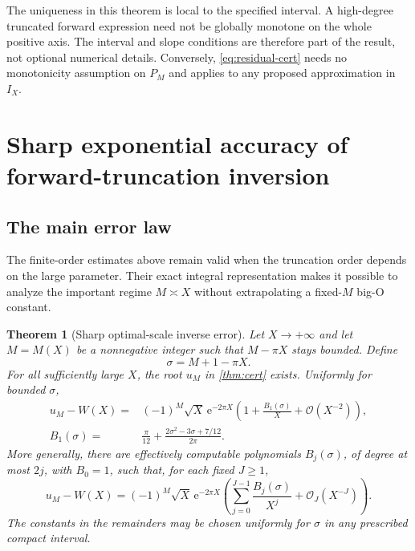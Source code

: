 \documentclass[11pt,a4paper]{article}
\newtheorem{theorem}{Theorem}[section]
\theoremstyle{definition}
\numberwithin{equation}{section}
\newcommand{\ee}{\mathrm{e}}
\newcommand{\Oh}{\mathcal O}
\begin{document}
The uniqueness in this theorem is local to the specified interval. A high-degree truncated forward expression need not be globally monotone on the whole positive axis. The interval and slope conditions are therefore part of the result, not optional numerical details. Conversely, \eqref{eq:residual-cert} needs no monotonicity assumption on $P_M$ and applies to any proposed approximation in $I_X$.

\section{Sharp exponential accuracy of forward-truncation inversion}
\label{sec:optimal}

\subsection{The main error law}
The finite-order estimates above remain valid when the truncation order depends on the large parameter. Their exact integral representation makes it possible to analyze the important regime $M\asymp X$ without extrapolating a fixed-$M$ big-O constant.

\begin{theorem}[Sharp optimal-scale inverse error]
\label{thm:optimal}
Let $X\to+\infty$ and let $M=M(X)$ be a nonnegative integer such that $M-\pi X$ stays bounded. Define
\begin{equation}
 \sigma=M+1-\pi X.
 \label{eq:sigma}
\end{equation}
For all sufficiently large $X$, the root $u_M$ in \cref{thm:cert} exists. Uniformly for bounded $\sigma$,
\begin{align}
 u_M-W(X)
 ={}&(-1)^M\sqrt X\,\ee^{-2\pi X}
   \left(1+\frac{B_1(\sigma)}X+\Oh(X^{-2})\right),
 \label{eq:optimal-error}\\
 B_1(\sigma)
 ={}&\frac\pi{12}
     +\frac{2\sigma^2-3\sigma+7/12}{2\pi}.
 \label{eq:B1}
\end{align}
More generally, there are effectively computable polynomials $B_j(\sigma)$, of degree at most $2j$, with $B_0=1$, such that, for each fixed $J\ge1$,
\begin{equation}
 u_M-W(X)=(-1)^M\sqrt X\,\ee^{-2\pi X}
 \left(\sum_{j=0}^{J-1}\frac{B_j(\sigma)}{X^j}
              +\Oh_J(X^{-J})\right).
 \label{eq:optimal-all}
\end{equation}
The constants in the remainders may be chosen uniformly for $\sigma$ in any prescribed compact interval.
\end{theorem}
\end{document}
